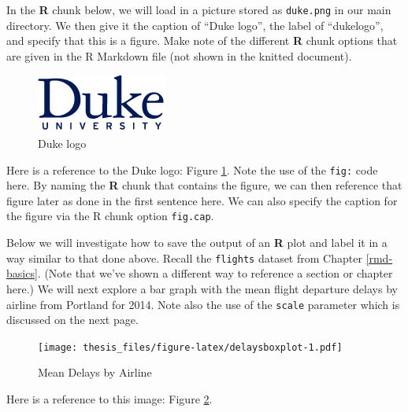 \documentclass[12pt,twoside]{dukestatscithesis}
\theoremstyle{definition}
\theoremstyle{definition}
\theoremstyle{definition}
\theoremstyle{remark}
\begin{document}
In the \textbf{R} chunk below, we will load in a picture stored as
\texttt{duke.png} in our main directory. We then give it the caption of
``Duke logo'', the label of ``dukelogo'', and specify that this is a
figure. Make note of the different \textbf{R} chunk options that are
given in the R Markdown file (not shown in the knitted document).
\begin{Shaded}
\begin{Highlighting}[]
\NormalTok{(} \NormalTok{)}
\end{Highlighting}
\end{Shaded}
\begin{figure}[htbp]
\centering
\includegraphics{figure/duke.png}
\caption{\label{fig:dukelogo}Duke logo}
\end{figure}
Here is a reference to the Duke logo: Figure \ref{fig:dukelogo}. Note
the use of the \texttt{fig:} code here. By naming the \textbf{R} chunk
that contains the figure, we can then reference that figure later as
done in the first sentence here. We can also specify the caption for the
figure via the R chunk option \texttt{fig.cap}.

\clearpage 

Below we will investigate how to save the output of an \textbf{R} plot
and label it in a way similar to that done above. Recall the
\texttt{flights} dataset from Chapter \ref{rmd-basics}. (Note that we've
shown a different way to reference a section or chapter here.) We will
next explore a bar graph with the mean flight departure delays by
airline from Portland for 2014. Note also the use of the \texttt{scale}
parameter which is discussed on the next page.
\begin{Shaded}
\end{Shaded}
\begin{figure}[htbp]
\centering
\texttt{[image: thesis\_files/figure-latex/delaysboxplot-1.pdf]}
\caption{\label{fig:delaysboxplot}Mean Delays by Airline}
\end{figure}
Here is a reference to this image: Figure \ref{fig:delaysboxplot}.
\end{document}
